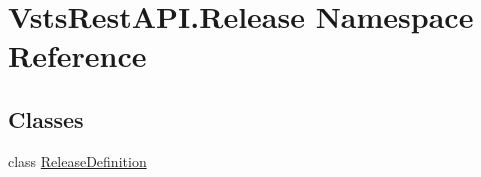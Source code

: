 \hypertarget{namespace_vsts_rest_a_p_i_1_1_release}{}\section{Vsts\+Rest\+A\+P\+I.\+Release Namespace Reference}
\label{namespace_vsts_rest_a_p_i_1_1_release}
\subsection*{Classes}
\begin{DoxyCompactItemize}
\item 
class \mbox{\hyperlink{class_vsts_rest_a_p_i_1_1_release_1_1_release_definition}{Release\+Definition}}
\end{DoxyCompactItemize}
